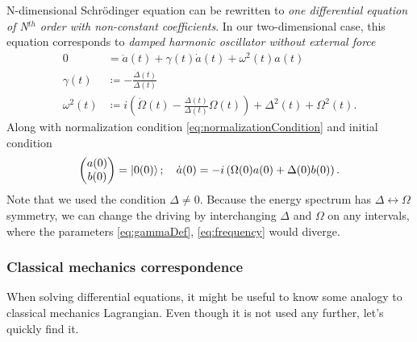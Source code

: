 N-dimensional Schr\"odinger equation can be rewritten to \emph{one differential equation of N$^{th}$ order with non-constant coefficients}. In our two-dimensional case, this equation corresponds to \emph{damped harmonic oscillator without external force}
\begin{align}
    0&= \ddot a(t)+ \gamma(t) \dot a(t)+\omega^2(t)a(t) \label{eq:harmonicOscillator}\\
    \gamma(t)&\coloneqq -\frac{\dot \Delta(t)}{\Delta(t)} \label{eq:gammaDef}\\
    \omega^2(t) &\coloneqq i\left(\dot \Omega(t)-\frac{\dot\Delta(t)}{\Delta(t)}\Omega(t)\right)+\Delta^2(t)+\Omega^2(t).
    \label{eq:frequency}
\end{align}
Along with normalization condition \ref{eq:normalizationCondition} and initial condition
\begin{equation}
    \begin{pmatrix}
        a(0)\\b(0)
    \end{pmatrix}=\ket{0(0)}; \quad \dot a(0)=-i\left(\Omega(0) a(0)+\Delta(0)b(0)\right).
\end{equation}
Note that we used the condition $\Delta\neq 0$. Because the energy spectrum has $\Delta\leftrightarrow \Omega$ symmetry, we can change the driving by interchanging $\Delta$ and $\Omega$ on any intervals, where the parameters \ref{eq:gammaDef}, \ref{eq:frequency} would diverge.


\subsubsection{Classical mechanics correspondence}
When solving differential equations, it might be useful to know some analogy to classical mechanics Lagrangian. Even though it is not used any further, let's quickly find it.

